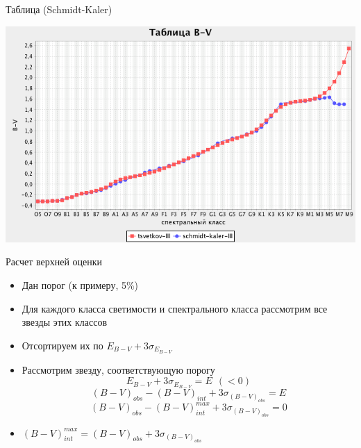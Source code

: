 \documentclass[14pt, fleqn, xcolor={dvipsnames, table}]{beamer}
\begin{document}
        \begin{frame}{Таблица (Schmidt-Kaler)}
            \begin{center}
                \includegraphics[scale=0.49]{table-sk.png}
            \end{center}
        \end{frame} 
        
        \begin{frame}{Расчет верхней оценки}
            \begin{itemize}
            		\item Дан порог (к примеру, 5\%)
            		\item Для каждого класса светимости и спектрального класса рассмотрим все звезды этих классов
            		\item Отсортируем их по $E_{B - V} + 3 \sigma_{E_{B - V}}$
            		\item Рассмотрим звезду, соответствующую порогу
            			$$E_{B - V} + 3 \sigma_{E_{B - V}} = E ~~ (< 0)$$
            			$$(B - V)_{obs} - (B - V)_{int} + 3 \sigma_{(B - V)_{obs}} = E$$
            			$$(B - V)_{obs} - (B - V)^{max}_{int} + 3 \sigma_{(B - V)_{obs}} = 0$$
            		\item $(B - V)^{max}_{int} = (B - V)_{obs} + 3 \sigma_{(B - V)_{obs}}$
            \end{itemize}
           
        \end{frame} 
        
\end{document}
